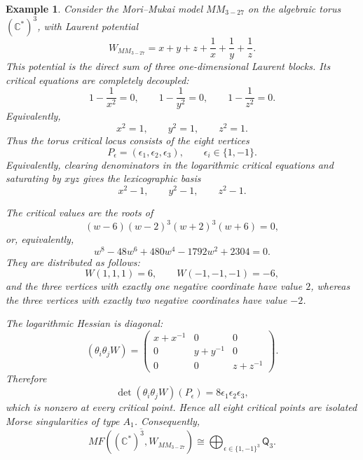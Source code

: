 \documentclass[11pt]{amsart}
\newtheorem{example}{Example}[section]
\newcommand{\MorseCat}[1]{\mathsf{Q}_{#1}}
\begin{document}
\begin{example}
Consider the Mori--Mukai model $MM_{3-27}$ on the algebraic torus
$(\mathbb{C}^*)^3$, with Laurent potential
\[
W_{MM_{3-27}}=x+y+z+\frac{1}{x}+\frac{1}{y}+\frac{1}{z}.
\]
This potential is the direct sum of three one-dimensional Laurent blocks. Its
critical equations are completely decoupled:
\[
1-\frac{1}{x^2}=0,
\qquad
1-\frac{1}{y^2}=0,
\qquad
1-\frac{1}{z^2}=0.
\]
Equivalently,
\[
x^2=1,
\qquad
y^2=1,
\qquad
z^2=1.
\]
Thus the torus critical locus consists of the eight vertices
\[
P_\epsilon=(\epsilon_1,\epsilon_2,\epsilon_3),
\qquad
\epsilon_i\in\{1,-1\}.
\]
Equivalently, clearing denominators in the logarithmic critical equations and
saturating by $xyz$ gives the lexicographic basis
\[
x^2-1,
\qquad
y^2-1,
\qquad
z^2-1.
\]

The critical values are the roots of
\[
(w-6)(w-2)^3(w+2)^3(w+6)=0,
\]
or, equivalently,
\[
w^8-48w^6+480w^4-1792w^2+2304=0.
\]
They are distributed as follows:
\[
W(1,1,1)=6,
\qquad
W(-1,-1,-1)=-6,
\]
and the three vertices with exactly one negative coordinate have value $2$,
whereas the three vertices with exactly two negative coordinates have value
$-2$.

The logarithmic Hessian is diagonal:
\[
(\theta_i\theta_jW)=
\begin{pmatrix}
x+x^{-1} & 0 & 0 \\
0 & y+y^{-1} & 0 \\
0 & 0 & z+z^{-1}
\end{pmatrix}.
\]
Therefore
\[
\det(\theta_i\theta_jW)(P_\epsilon)
=8\epsilon_1\epsilon_2\epsilon_3,
\]
which is nonzero at every critical point. Hence all eight critical points are
isolated Morse singularities of type $A_1$. Consequently,
\[
\overline{MF((\mathbb{C}^*)^3,W_{MM_{3-27}})}
\cong \bigoplus_{\epsilon\in\{1,-1\}^3}\MorseCat{3}.
\]
\end{example}
\end{document}
